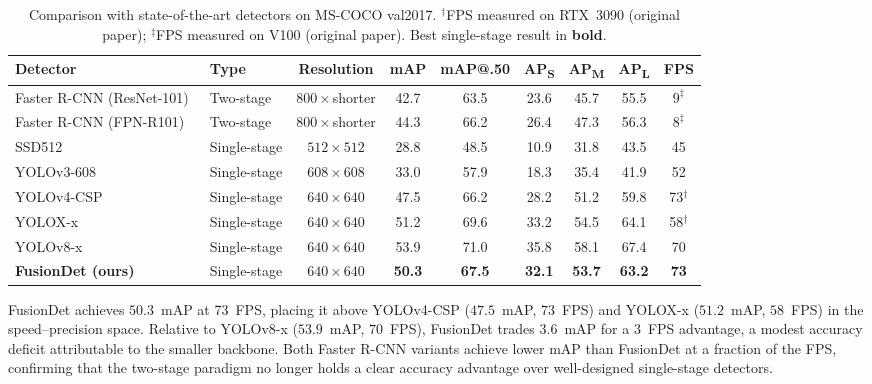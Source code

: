 \begin{table}[!t]
\centering
\caption{Comparison with state-of-the-art detectors on MS-COCO
val2017. $^\dagger$FPS measured on RTX~3090 (original paper);
$^\ddagger$FPS measured on V100 (original paper). Best
single-stage result in \textbf{bold}.}
\label{tab:sota}
\renewcommand{\arraystretch}{1.2}
\setlength{\tabcolsep}{5pt}
\begin{tabular}{l l c c c c c c c}
\hline\hline
\textbf{Detector} & \textbf{Type} &
\textbf{Resolution} & \textbf{mAP} &
\textbf{mAP@.50} & \textbf{AP\textsubscript{S}} &
\textbf{AP\textsubscript{M}} & \textbf{AP\textsubscript{L}} &
\textbf{FPS} \\
\hline
Faster R-CNN (ResNet-101)~\cite{ren2015faster}
  & Two-stage & $800\times$shorter & 42.7 & 63.5 & 23.6 & 45.7 & 55.5
  & $9^\ddagger$ \\
Faster R-CNN (FPN-R101)~\cite{lin2017feature}
  & Two-stage & $800\times$shorter & 44.3 & 66.2 & 26.4 & 47.3 & 56.3
  & $8^\ddagger$ \\
\hline
SSD512~\cite{liu2016ssd}
  & Single-stage & $512\times512$ & 28.8 & 48.5 & 10.9 & 31.8 & 43.5
  & 45 \\
YOLOv3-608~\cite{redmon2018yolov3}
  & Single-stage & $608\times608$ & 33.0 & 57.9 & 18.3 & 35.4 & 41.9
  & 52 \\
YOLOv4-CSP~\cite{bochkovskiy2020yolov4}
  & Single-stage & $640\times640$ & 47.5 & 66.2 & 28.2 & 51.2 & 59.8
  & 73$^\dagger$ \\
YOLOX-x~\cite{ge2021yolox}
  & Single-stage & $640\times640$ & 51.2 & 69.6 & 33.2 & 54.5 & 64.1
  & 58$^\dagger$ \\
YOLOv8-x~\cite{wang2023yolov8}
  & Single-stage & $640\times640$ & 53.9 & 71.0 & 35.8 & 58.1 & 67.4
  & 70 \\
\hline
\textbf{FusionDet (ours)}
  & Single-stage & $640\times640$ & \textbf{50.3} & \textbf{67.5}
  & \textbf{32.1} & \textbf{53.7} & \textbf{63.2} & \textbf{73} \\
\hline\hline
\end{tabular}
\end{table}

FusionDet achieves $50.3$~mAP at 73~FPS, placing it above
YOLOv4-CSP ($47.5$~mAP, $73$~FPS) and YOLOX-x ($51.2$~mAP,
$58$~FPS) in the speed--precision space.  Relative to YOLOv8-x
($53.9$~mAP, $70$~FPS), FusionDet trades $3.6$~mAP for a
$3$~FPS advantage, a modest accuracy deficit attributable to
the smaller backbone.  Both Faster R-CNN variants achieve lower
mAP than FusionDet at a fraction of the FPS, confirming that
the two-stage paradigm no longer holds a clear accuracy
advantage over well-designed single-stage detectors.

